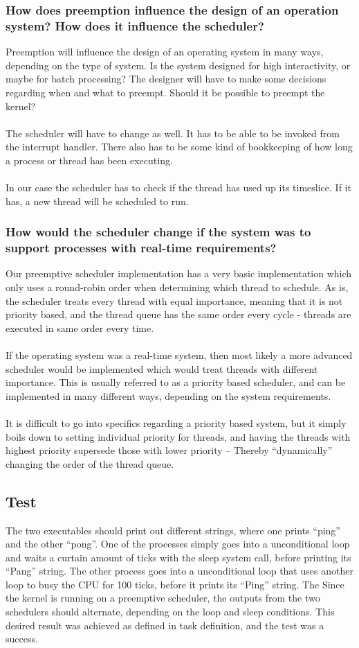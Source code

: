 \subsubsection*{How does preemption influence the design of an operation system? How does it influence the scheduler?}
Preemption will influence the design of an operating system in many ways, depending on the type of system. Is the system designed for high interactivity, or maybe for batch processing? The designer will have to make some decisions regarding when and what to preempt. Should it be possible to preempt the kernel? \\
\\
The scheduler will have to change as well. It has to be able to be invoked from the interrupt handler. There also has to be some kind of bookkeeping of how long a process or thread has been executing. \\
\\
In our case the scheduler has to check if the thread has used up its timeslice. If it has, a new thread will be scheduled to run.

\subsubsection*{How would the scheduler change if the system was to support processes with real-time requirements?}
Our preemptive scheduler implementation has a very basic implementation which only uses a round-robin order when determining which thread to schedule. As is, the scheduler treats every thread with equal importance, meaning that it is not priority based, and the thread queue has the same order every cycle - threads are executed in same order every time.\\
\\
If the operating system was a real-time system, then most likely a more advanced scheduler would be implemented which would treat threads with different importance. This is usually referred to as a priority based scheduler, and can be implemented in many different ways, depending on the system requirements.\\
\\
It is difficult to go into specifics regarding a priority based system, but it simply boils down to setting individual priority for threads, and having the threads with highest priority supersede those with lower priority – Thereby ``dynamically'' changing the order of the thread queue.

\subsection{Test}
The two executables should print out different strings, where one prints “ping” and the other “pong”. One of the processes simply goes into a unconditional loop and waits a curtain amount of ticks with the sleep system call, before printing its “Pang” string. The other process goes into a unconditional loop that uses another loop to busy the CPU for 100 ticks, before it prints its “Ping” string. The  Since the kernel is running on a preemptive scheduler, the outputs from the two schedulers should alternate, depending on the loop and sleep conditions. This desired result was achieved as defined in task definition, and the test was a success.